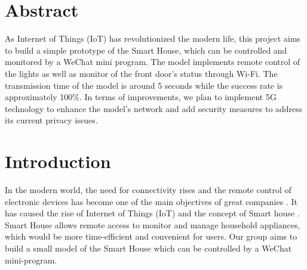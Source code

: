 \documentclass[a0,portrait]{a0poster}
\begin{document}
\vspace{0.5cm} %


\begin{multicols}{2} %


\color{Navy} %

\section*{Abstract}
\Large
As Internet of Things (IoT) has revolutionized the modern life, this project aims to build a simple prototype of the Smart House, which can be controlled and monitored by a WeChat mini program. The model implements remote control of the lights as well as monitor of the front door's status through Wi-Fi. The transmission time of the model is around 5 seconds while the success rate is approximately 100\%. In terms of improvements, we plan to implement 5G technology to enhance the model's network and add security measures to address its current privacy issues.


\color{SaddleBrown} %
\section*{Introduction}
\Large
In the modern world, the need for connectivity rises and the remote control of electronic devices has become one of the main objectives of great companies \cite{shang2012internet}. It has caused the rise of Internet of Things (IoT) and the concept of Smart house \cite{yang2018iot}. Smart House allows remote access to monitor and manage household appliances, which would be more time-efficient and convenient for users. Our group aims to build a small model of the Smart House which can be controlled by a WeChat mini-program.



\end{multicols}
\end{document}
